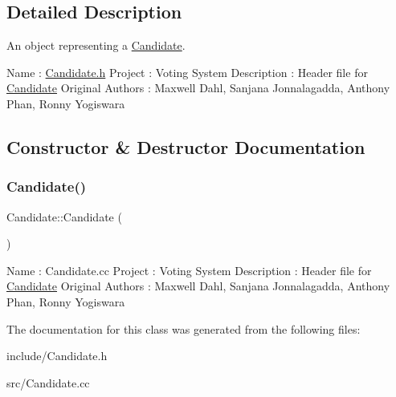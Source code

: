 \subsection{Detailed Description}
An object representing a \mbox{\hyperlink{class_candidate}{Candidate}}. 



 Name \+: \mbox{\hyperlink{_candidate_8h_source}{Candidate.\+h}} Project \+: Voting System Description \+: Header file for \mbox{\hyperlink{class_candidate}{Candidate}} Original Authors \+: Maxwell Dahl, Sanjana Jonnalagadda, Anthony Phan, Ronny Yogiswara 

\subsection{Constructor \& Destructor Documentation}
\mbox{\label{class_candidate_aa2747741fb662af5e8f3d01d1d1a43b6}} 
\subsubsection{\texorpdfstring{Candidate()}{Candidate()}}
{\footnotesize\ttfamily Candidate\+::\+Candidate (\begin{DoxyParamCaption}{ }\end{DoxyParamCaption})}



 Name \+: Candidate.\+cc Project \+: Voting System Description \+: Header file for \mbox{\hyperlink{class_candidate}{Candidate}} Original Authors \+: Maxwell Dahl, Sanjana Jonnalagadda, Anthony Phan, Ronny Yogiswara 

The documentation for this class was generated from the following files\+:\begin{DoxyCompactItemize}
\item 
include/Candidate.\+h\item 
src/Candidate.\+cc\end{DoxyCompactItemize}
